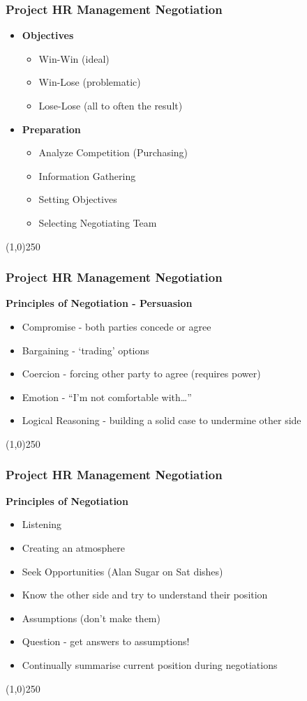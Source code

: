 \begin{frame}
\frametitle{Project HR Management \hfill Negotiation}
\begin{itemize}
	\item \textbf{Objectives} 
		\begin{itemize}
			\item Win-Win (ideal)
			\item Win-Lose (problematic)
			\item Lose-Lose (all to often the result)
		\end{itemize}
	\item \textbf{Preparation}
		\begin{itemize}
			\item Analyze Competition (Purchasing)
			\item Information Gathering
			\item Setting Objectives
			\item Selecting Negotiating Team
		\end{itemize}
\end{itemize}
\end{frame}\begin{center}\line(1,0){250}\end{center}

\begin{frame}
\frametitle{Project HR Management \hfill Negotiation}
\textbf{Principles of Negotiation - Persuasion}
\begin{itemize}
	\item Compromise - both parties concede or agree
	\item Bargaining - `trading' options
	\item Coercion - forcing other party to agree (requires power)
	\item Emotion - ``I'm not comfortable with\ldots''
	\item Logical Reasoning - building a solid case to undermine other side
\end{itemize}
\end{frame}\begin{center}\line(1,0){250}\end{center}

 
\begin{frame}
\frametitle{Project HR Management \hfill Negotiation}
\textbf{Principles of Negotiation}
\begin{itemize}
	\item Listening
	\item Creating an atmosphere
	\item Seek Opportunities (Alan Sugar on Sat dishes)
	\item Know the other side and try to understand their position
	\item Assumptions (don't make them)
	\item Question - get answers to assumptions!
	\item Continually summarise current position during negotiations
\end{itemize}
\end{frame}\begin{center}\line(1,0){250}\end{center} 
 



